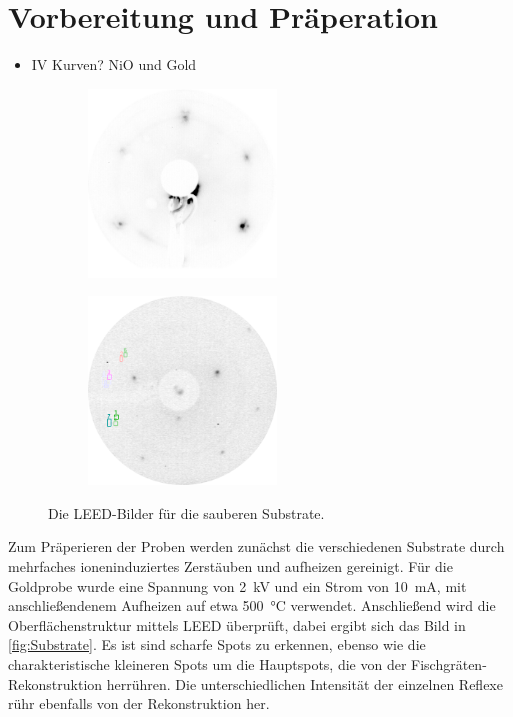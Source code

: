     \section{Vorbereitung und Präperation}
        \label{sec:Praep}
        \begin{itemize}
            \item IV Kurven? NiO und Gold
        \end{itemize}
            \begin{figure}
                \centering
                \begin{subfigure}{0.48\textwidth}
                    \centering
                    \includegraphics[height=5cm]{./content/pictures/2021_06_08_002_Au(111)_75eV}
                    \label{fig:LEED_Au}
                \end{subfigure}
                \begin{subfigure}{0.48\textwidth}
                    \centering
                    \includegraphics[height=5cm]{./content/pictures/FeO/2021_09_07_002_passivatedFe(100)_125eV.png}
                    \label{fig:LEED_pFe}
                \end{subfigure}
                \caption{Die LEED-Bilder für die sauberen Substrate.}
            \label{fig:Substrate}
            \end{figure}
            Zum Präperieren der Proben werden zunächst die verschiedenen Substrate durch mehrfaches ioneninduziertes Zerstäuben und aufheizen gereinigt.
            Für die Goldprobe wurde eine Spannung von \SI{2}{\kilo\volt} und ein Strom von \SI{10}{\milli\ampere}, mit anschließendenem Aufheizen auf etwa \SI{500}{\celsius} verwendet.
            Anschließend wird die Oberflächenstruktur mittels LEED überprüft, dabei ergibt sich das Bild in \autoref{fig:Substrate}.
            Es ist sind scharfe Spots zu erkennen, ebenso wie die charakteristische kleineren Spots um die Hauptspots, die von der Fischgräten-Rekonstruktion herrühren.
            Die unterschiedlichen Intensität der einzelnen Reflexe rühr ebenfalls von der Rekonstruktion her.


